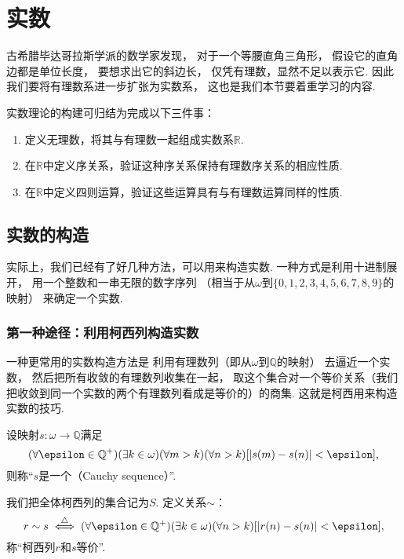 \section{实数}
古希腊毕达哥拉斯学派的数学家发现，
对于一个等腰直角三角形，
假设它的直角边都是单位长度，
要想求出它的斜边长，
仅凭有理数，显然不足以表示它.
因此我们要将有理数系进一步扩张为实数系，
这也是我们本节要着重学习的内容.

实数理论的构建可归结为完成以下三件事：\begin{enumerate}
	\item 定义无理数，将其与有理数一起组成实数系\(\mathbb{R}\).
	\item 在\(\mathbb{R}\)中定义序关系，验证这种序关系保持有理数序关系的相应性质.
	\item 在\(\mathbb{R}\)中定义四则运算，验证这些运算具有与有理数运算同样的性质.
\end{enumerate}

\subsection{实数的构造}
实际上，我们已经有了好几种方法，可以用来构造实数.
一种方式是利用十进制展开，
用一个整数和一串无限的数字序列
（相当于从\(\omega\)到\(\{0,1,2,3,4,5,6,7,8,9\}\)的映射）
来确定一个实数.

\subsubsection*{第一种途径：利用柯西列构造实数}
一种更常用的实数构造方法是
利用有理数列（即从\(\omega\)到\(\mathbb{Q}\)的映射）
去逼近一个实数，
然后把所有收敛的有理数列收集在一起，
取这个集合对一个等价关系（我们把收敛到同一个实数的两个有理数列看成是等价的）的商集.
这就是柯西用来构造实数的技巧.

\begin{definition}
设映射\(s\colon \omega\to\mathbb{Q}\)满足\[
	(\forall\epsilon\in\mathbb{Q}^+)(\exists k\in\omega)(\forall m>k)(\forall n>k)
	[\abs{s(m) - s(n)}<\epsilon],
\]
则称“\(s\)是一个（Cauchy sequence）”.
\end{definition}

\begin{definition}
我们把全体柯西列的集合记为\(S\).
定义关系\(\sim\)：\[
	r \sim s
	\defiff
	(\forall\epsilon\in\mathbb{Q}^+)(\exists k\in\omega)(\forall n>k)
	[\abs{r(n)-s(n)}<\epsilon],
\]
称“柯西列\(r\)和\(s\)等价”.
\end{definition}

